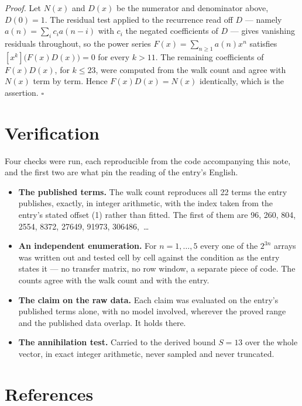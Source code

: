\documentclass[11pt]{article}
\theoremstyle{definition}
\begin{document}
{\itshape Proof.} Let $N(x)$ and $D(x)$ be the numerator and denominator above, $D(0)=1$. The residual test applied to the recurrence read off $D$ --- namely $a(n) = \sum_i c_i a(n-i)$ with $c_i$ the negated coefficients of $D$ --- gives vanishing residuals throughout, so the power series $F(x)=\sum_{n\ge 1}a(n)x^n$ satisfies $[x^k]\bigl(F(x)D(x)\bigr) = 0$ for every $k > 11$. The remaining coefficients of $F(x)D(x)$, for $k \le 23$, were computed from the walk count and agree with $N(x)$ term by term. Hence $F(x)D(x) = N(x)$ identically, which is the assertion. $\square$

\section{Verification}

Four checks were run, each reproducible from the code accompanying this note, and the first two are what pin the reading of the entry's English.

\begin{itemize}

\item {\bfseries The published terms.} The walk count reproduces all 22 terms the entry publishes, exactly, in integer arithmetic, with the index taken from the entry's stated offset (1) rather than fitted. The first of them are 96, 260, 804, 2554, 8372, 27649, 91973, 306486,~\dots

\item {\bfseries An independent enumeration.} For $n = 1,\dots,5$ every one of the $2^{3n}$ arrays was written out and tested cell by cell against the condition as the entry states it --- no transfer matrix, no row window, a separate piece of code. The counts agree with the walk count and with the entry.

\item {\bfseries The claim on the raw data.} Each claim was evaluated on the entry's published terms alone, with no model involved, wherever the proved range and the published data overlap. It holds there.

\item {\bfseries The annihilation test.} Carried to the derived bound $S = 13$ over the whole vector, in exact integer arithmetic, never sampled and never truncated.

\end{itemize}

\section{References}
\end{document}
